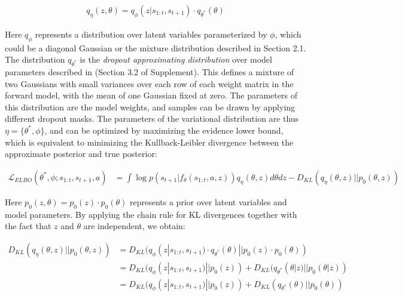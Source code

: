\documentclass{article} %
\begin{document}
\begin{align*}
  q_\eta(z, \theta) = q_\phi(z | s_{1:t}, s_{t+1}) \cdot q_{\theta^*}(\theta)
\end{align*}

Here $q_\phi$ represents a distribution over latent variables parameterized by $\phi$, which could be a diagonal Gaussian or the mixture distribution described in Section 2.1. 
The distribution $q_{\theta^*}$ is the \textit{dropout approximating distribution} over model parameters described in \citep{Gal16} (Section 3.2 of Supplement). 
This defines a mixture of two Gaussians with small variances over each row of each weight matrix in the forward model, with the mean of one Gaussian fixed at zero. The parameters of this distribution are the model weights, and samples can be drawn by applying different dropout masks. The parameters of the variational distribution are thus $\eta = \{ \theta^*, \phi \}$, 
and can be optimized by maximizing the evidence lower bound, which is equivalent to minimizing the Kullback-Leibler divergence between the approximate posterior and true posterior:



\begin{align}
  \mathcal{L}_{ELBO}(\theta^*, \phi; s_{1:t}, s_{t+1}, a) &= \int \log p(s_{t+1} | f_\theta(s_{1:t}, a, z)) q_\eta(\theta, z) d\theta dz -  D_{KL}(q_\eta(\theta, z) || p_0(\theta, z))
  \label{elbo}
\end{align}

Here $p_0(z, \theta) = p_0(z) \cdot p_0(\theta)$ represents a prior over latent variables and model parameters. By applying the chain rule for KL divergences together with the fact that $z$ and $\theta$ are independent, we obtain:

\begin{align*}
D_{KL}(q_\eta(\theta, z) || p_0(\theta, z)) &= D_{KL}(q_\phi(z | s_{1:t}, s_{t+1}) \cdot q_{\theta^*}(\theta) || p_0(z) \cdot p_0(\theta)) \\
&= D_{KL}(q_\phi(z | s_{1:t}, s_{t+1}) || p_0(z)) + D_{KL}(q_{\theta^*}(\theta | z) || p_0(\theta | z))  \\
&= D_{KL}(q_\phi(z | s_{1:t}, s_{t+1}) || p_0(z)) + D_{KL}(q_{\theta^*}(\theta) || p_0(\theta))  \\
\end{align*}
\end{document}
